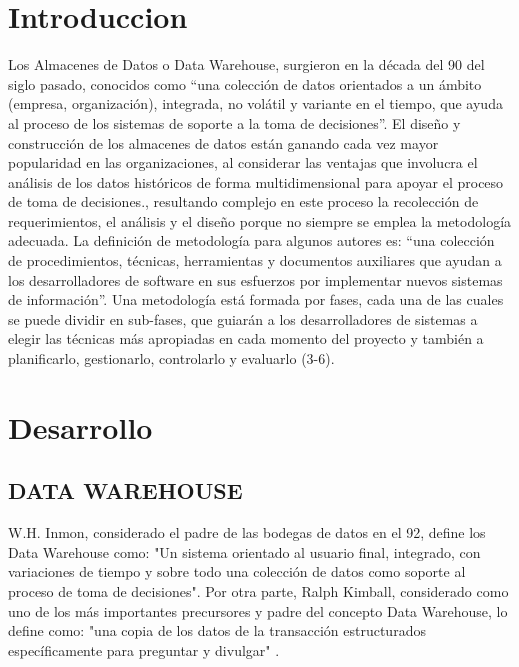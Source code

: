 \documentclass[twoside,twocolumn]{article}
\begin{document}
\section{Introduccion}
Los Almacenes de Datos o Data Warehouse, surgieron en la década del 90
del siglo pasado, conocidos como “una colección de datos orientados a un ámbito (empresa,
organización), integrada, no volátil y variante en el tiempo, que ayuda al proceso de los sistemas de
soporte a la toma de decisiones”. El diseño y construcción de los almacenes de datos están ganando
cada vez mayor popularidad en las organizaciones, al considerar las ventajas que involucra el análisis de
los datos históricos de forma multidimensional para apoyar el proceso de toma de decisiones.,
resultando complejo en este proceso la recolección de requerimientos, el análisis y el diseño porque no
siempre se emplea la metodología adecuada. 
La definición de metodología para algunos autores es: “una colección de procedimientos, técnicas,
herramientas y documentos auxiliares que ayudan a los desarrolladores de software en sus esfuerzos por
implementar nuevos sistemas de información”. Una metodología está formada por fases, cada una de las
cuales se puede dividir en sub-fases, que guiarán a los desarrolladores de sistemas a elegir las técnicas
más apropiadas en cada momento del proyecto y también a planificarlo, gestionarlo, controlarlo y
evaluarlo (3-6). 
\begin{center}

\end{center}

\section{Desarrollo}

\subsection{DATA WAREHOUSE}

W.H. Inmon, considerado el padre de las bodegas de datos en el 92, define los Data Warehouse como: "Un sistema orientado al usuario final, integrado, con variaciones de tiempo y sobre todo una colección de datos como soporte al proceso de toma de decisiones". Por otra parte, Ralph Kimball, considerado como uno de los más importantes precursores y padre del concepto Data Warehouse, lo define como: "una copia de los datos de la transacción estructurados específicamente para preguntar y divulgar" . 
\end{document}
